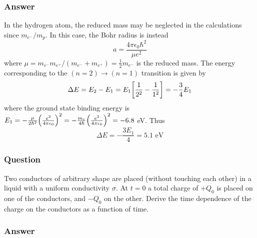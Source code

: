 \subsubsection{Answer}
In the hydrogen atom, the reduced mass may be neglected in the calculations since $m_{e^-}/m_p$. In this case, the Bohr radius is instead
\begin{equation*}
	a = \frac{4\pi \epsilon_0\hbar^2}{\mu e^2}
\end{equation*}
where $\mu = m_{e^-}m_{e^+}/(m_{e^{-}} + m_{e^{+}}) = \frac{1}{2}m_{e^-}$ is the reduced mass. The energy corresponding to the $(n=2)\to(n=1)$ transition is given by 
\begin{align*}
	\Delta E = E_2 - E_1 = E_1\qty[\frac{1}{2^2} - \frac{1}{1^2}] = - \frac{3}{4} E_1
\end{align*}
where the ground state binding energy is $E_1 = - \frac{\mu}{2\hbar^2}\qty(\frac{e^2}{4\pi \epsilon_0})^2 = - \frac{m_e}{4\hbar}\qty(\frac{e^2}{4\pi \epsilon_0})^2 = -6.8$ eV. Thus
\begin{equation}
	\boxed{\Delta E = - \frac{3E_1}{4} = 5.1 \text{ eV}}
\end{equation}


\subsubsection{Question}
Two conductors of arbitrary shape are placed (without touching each other) in a liquid with a uniform conductivity $\sigma$. At $t = 0$ a total charge of $+Q_0$ is placed on one of the conductors, and $-Q_0$ on the other. Derive the time dependence of the charge on the conductors as a function of time.

\subsubsection{Answer}


